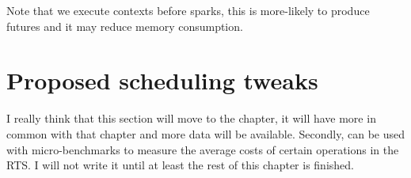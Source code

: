 
Note that we execute contexts before sparks,
this is more-likely to produce futures and it may reduce memory consumption.

\section{Proposed scheduling tweaks}
\label{sec:proposed_tweaks}

I really think that this section will move to the \tscope chapter,
it will have more in common with that chapter and more data will be
available.
Secondly, \tscope can be used with micro-benchmarks to measure the
average costs of certain operations in the RTS.
I will not write it until at least the rest of this chapter is finished.

%
%

%

%
%

